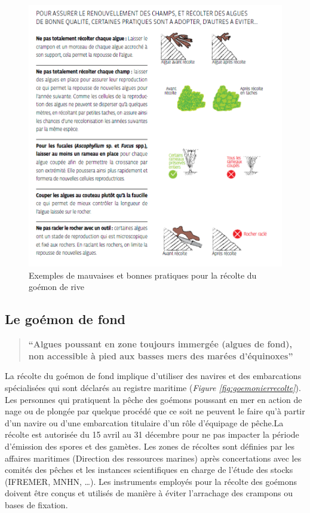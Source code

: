 \documentclass[
]{book}
\begin{document}
\begin{figure}

{\centering \includegraphics[width=12.85in]{images/alguerivepratique} 

}

\caption{Exemples de mauvaises et bonnes pratiques pour la récolte du goémon de rive}\label{fig:alguepratique}
\end{figure}

\hypertarget{le-gouxe9mon-de-fond}{%
\subsection{Le goémon de fond}\label{le-gouxe9mon-de-fond}}

\begin{quote}
\textbf{``Algues poussant en zone toujours immergée (algues de fond), non accessible à pied aux basses mers des marées d'équinoxes''}
\end{quote}

La récolte du goémon de fond implique d'utiliser des navires et des embarcations spécialisées qui sont déclarés au registre maritime (\emph{Figure \ref{fig:goemonierrecolte}}). Les personnes qui pratiquent la pêche des goémons poussant en mer en action de nage ou de plongée par quelque procédé que ce soit ne peuvent le faire qu'à partir d'un navire ou d'une embarcation titulaire d'un rôle d'équipage de pêche.La récolte est autorisée du 15 avril au 31 décembre pour ne pas impacter la période d'émission des spores et des gamètes. Les zones de récoltes sont définies par les affaires maritimes (Direction des ressources marines) après concertations avec les comités des pêches et les instances scientifiques en charge de l'étude des stocks (IFREMER, MNHN, \ldots). Les instruments employés pour la récolte des goémons doivent être conçus et utilisés de manière à éviter
l'arrachage des crampons ou bases de fixation.
\end{document}
